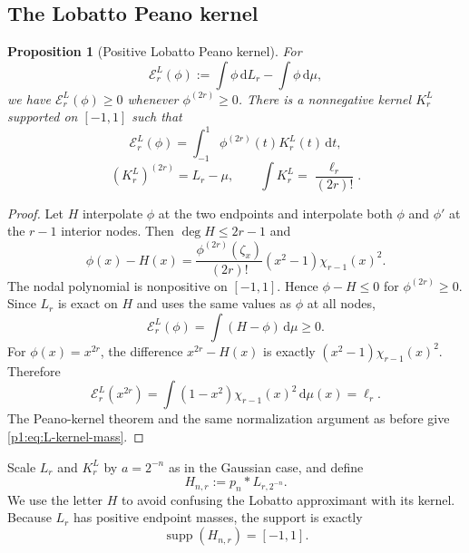 \documentclass[11pt]{article}
\numberwithin{equation}{section}
\newtheorem{proposition}[theorem]{Proposition}
\theoremstyle{definition}
\theoremstyle{remark}
\DeclareMathOperator{\supp}{supp}
\newcommand{\dd}{\,\mathrm d}
\begin{document}
\subsection{The Lobatto Peano kernel}

\begin{proposition}[Positive Lobatto Peano kernel]
\label{p1:prop:L-kernel}
For
\begin{equation}
 \mathcal E_r^L(\phi):=\int\phi\dd L_r-\int\phi\dd\mu,
 \label{p1:eq:L-functional}
\end{equation}
we have $\mathcal E_r^L(\phi)\ge0$ whenever $\phi^{(2r)}\ge0$.  There is a nonnegative kernel $K_r^L$ supported on $[-1,1]$ such that
\begin{equation}
 \mathcal E_r^L(\phi)=\int_{-1}^{1}\phi^{(2r)}(t)K_r^L(t)\dd t,
 \label{p1:eq:L-Peano}
\end{equation}
\begin{equation}
 (K_r^L)^{(2r)}=L_r-\mu,
 \qquad
 \int K_r^L=\frac{\ell_r}{(2r)!}.
 \label{p1:eq:L-kernel-mass}
\end{equation}
\end{proposition}

\begin{proof}
Let $H$ interpolate $\phi$ at the two endpoints and interpolate both $\phi$ and $\phi'$ at the $r-1$ interior nodes.  Then $\deg H\le2r-1$ and
\begin{equation}
 \phi(x)-H(x)
 =\frac{\phi^{(2r)}(\zeta_x)}{(2r)!}
 (x^2-1)\chi_{r-1}(x)^2.
 \label{p1:eq:L-Hermite-remainder}
\end{equation}
The nodal polynomial is nonpositive on $[-1,1]$.  Hence $\phi-H\le0$ for $\phi^{(2r)}\ge0$.  Since $L_r$ is exact on $H$ and uses the same values as $\phi$ at all nodes,
\[
 \mathcal E_r^L(\phi)=\int(H-\phi)\dd\mu\ge0.
\]
For $\phi(x)=x^{2r}$, the difference $x^{2r}-H(x)$ is exactly
\((x^2-1)\chi_{r-1}(x)^2\).  Therefore
\[
 \mathcal E_r^L(x^{2r})
 =\int(1-x^2)\chi_{r-1}(x)^2\dd\mu(x)
 =\ell_r.
\]
The Peano-kernel theorem and the same normalization argument as before give \eqref{p1:eq:L-kernel-mass}.
\end{proof}

Scale $L_r$ and $K_r^L$ by $a=2^{-n}$ as in the Gaussian case, and define
\begin{equation}
 H_{n,r}:=p_n*L_{r,2^{-n}}.
 \label{p1:eq:Hnr}
\end{equation}
We use the letter $H$ to avoid confusing the Lobatto approximant with its kernel.  Because $L_r$ has positive endpoint masses, the support is exactly
\begin{equation}
 \supp(H_{n,r})=[-1,1].
 \label{p1:eq:H-support}
\end{equation}
\end{document}
